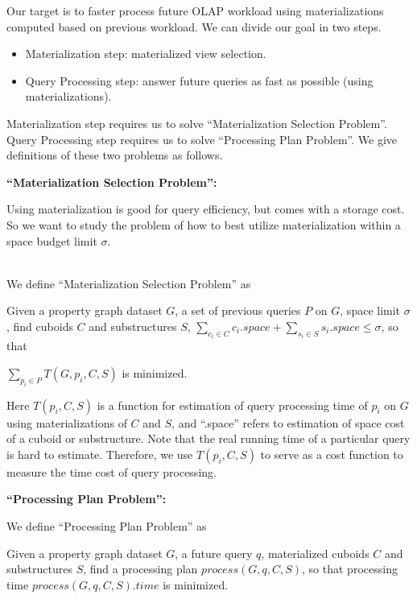 Our target is to faster process future OLAP workload using materializations computed based on previous workload. We can divide our goal in two steps. 

\begin{itemize}
	\item Materialization step: materialized view selection. 
	\item Query Processing step: answer future queries as fast as possible (using materializations). 
\end{itemize} 

Materialization step requires us to solve ``Materialization Selection Problem''. Query Processing step requires us to solve ``Processing Plan Problem''. We give definitions of these two problems as follows.

\textbf{``Materialization Selection Problem'':}

Using materialization is good for query efficiency, but comes with a storage cost. So we want to study the problem of how to best utilize materialization within a space budget limit $\sigma$. 


\\
We define ``Materialization Selection Problem'' as

Given a property graph dataset $G$, a set of previous queries $P$ on $G$, space limit $\sigma$, find cuboids $C$ and substructures $S$, $\displaystyle{\sum_{c_{i}\in C}c_{i}.space} + 
\displaystyle{\sum_{s_{i}\in S}s_{i}.space} 
\leq \sigma
$, so that 

$\displaystyle{\sum_{p_{i}\in P}T(G, p_{i}, C, S)}$  is minimized. 

Here $T(p_{i}, C, S)$ is a function for estimation of query processing time of $p_{i}$ on $G$ using materializations of $C$ and $S$, and ``.space'' refers to estimation of space cost of a cuboid or substructure. Note that the real running time of a particular query is hard to estimate. Therefore, we use $T(p_{i}, C, S)$ to serve as a cost function to measure the time cost of query processing. 


\textbf{``Processing Plan Problem'':}

We define ``Processing Plan Problem'' as


Given a property graph dataset $G$, a future query $q$, materialized cuboids $C$ and substructures $S$, find a processing plan $process(G, q, C, S)$, so that processing time $process(G, q, C, S).time$ is minimized. 

